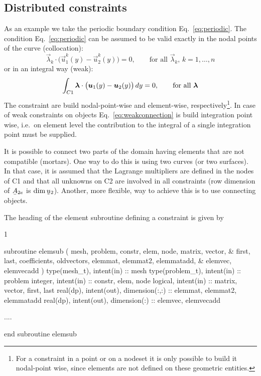 \subsection*{Distributed constraints}

As an example we take the periodic boundary condition Eq.~\eqref{eq:periodic}.
The condition Eq.~\eqref{eq:periodic} can be assumed to be valid exactly in the
nodal points of the curve (collocation):
\begin{equation}
      \vec\lambda_k\cdot\bigl( \vec u^k_1(y) - \vec u^k_2(y) \bigr)=0,
   \qquad\text{for all $\vec\lambda_k$, $k=1,\ldots,n$}
    \label{eq:collocationconnection}
\end{equation}
 or in an integral way (weak):
\begin{equation}
    \int_{C1} \boldsymbol{\lambda}\cdot\bigl( \boldsymbol{u}_1(y) - \boldsymbol{u}_2(y) \bigr)\,d y=0,
   \qquad\text{for all $\boldsymbol{\lambda}$}
    \label{eq:weakconnection}
\end{equation}
The constraint are build nodal-point-wise and element-wise,
respectively\footnote{For a constraint in a point or on a nodeset it is only
possible to build it nodal-point wise, since elements are not defined on these
geometric entities.}.
In case of weak constraints on objects Eq.~\eqref{eq:weakconnection} is build
integration point wise, i.e.\ on element level the contribution to the integral
of a single integration point must be supplied.

It is possible to connect two parts of the domain
having elements that are not compatible
(mortars). 
One way to do this is using two curves (or two surfaces).
In that case, it is assumed that the Lagrange multipliers are
defined in the nodes of C1 and that all unknowns on C2 are involved in
all constraints (row dimension of $\mat A_{2e}$ is $\dim{\col u_2}$).
Another, more flexible, way to achieve this is to use connecting objects.

The heading of the element subroutine defining a constraint is given by
\begin{listing}{1}
   
  subroutine elemsub ( mesh, problem, constr, elem, node, matrix, vector, &
    first, last, coefficients, oldvectors, elemmat, elemmat2, elemmatadd, &
    elemvec, elemvecadd )
    type(mesh_t), intent(in) :: mesh
    type(problem_t), intent(in) :: problem
    integer, intent(in) :: constr, elem, node
    logical, intent(in) :: matrix, vector, first, last
    real(dp), intent(out), dimension(:,:) :: elemmat, elemmat2, elemmatadd
    real(dp), intent(out), dimension(:) :: elemvec, elemvecadd

     ....

  end subroutine elemsub

\end{listing}

